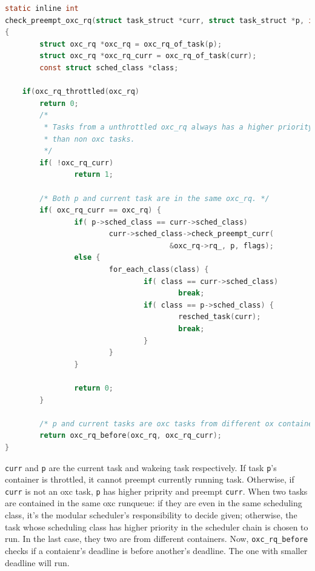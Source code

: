 \begin{lstlisting}[language=C]
static inline int
check_preempt_oxc_rq(struct task_struct *curr, struct task_struct *p, int flags)
{
        struct oxc_rq *oxc_rq = oxc_rq_of_task(p);
        struct oxc_rq *oxc_rq_curr = oxc_rq_of_task(curr);
        const struct sched_class *class;

	if(oxc_rq_throttled(oxc_rq)
		return 0;
        /* 
         * Tasks from a unthrottled oxc_rq always has a higher priority 
         * than non oxc tasks.
         */
        if( !oxc_rq_curr)
                return 1;

        /* Both p and current task are in the same oxc_rq. */
        if( oxc_rq_curr == oxc_rq) {
                if( p->sched_class == curr->sched_class) 
                        curr->sched_class->check_preempt_curr(
                                      &oxc_rq->rq_, p, flags);
                else {
                        for_each_class(class) {
                                if( class == curr->sched_class)
                                        break;
                                if( class == p->sched_class) {
                                        resched_task(curr);
                                        break;
                                }
                        }
                }

                return 0;
        }

        /* p and current tasks are oxc tasks from different ox containers. */
        return oxc_rq_before(oxc_rq, oxc_rq_curr);
}
\end{lstlisting}
\texttt{curr} and \texttt{p} are the current task and wakeing task respectively.
If task \texttt{p}'s container is throttled, it cannot preempt currently running task.
Otherwise, if \texttt{curr} is not an oxc task, \texttt{p} has higher priprity and
preempt \texttt{curr}. When two tasks are contained in the same oxc runqueue: if 
they are even in the same scheduling class, it's the modular scheduler's responsibility
to decide given; otherwise, the task whose scheduling class has higher priority in the
scheduler chain is chosen to run. In the last case, they two are from different 
containers. Now, \texttt{oxc\_rq\_before} checks if a contaienr's deadline is before
another's deadline. The one with smaller deadline will run. 

